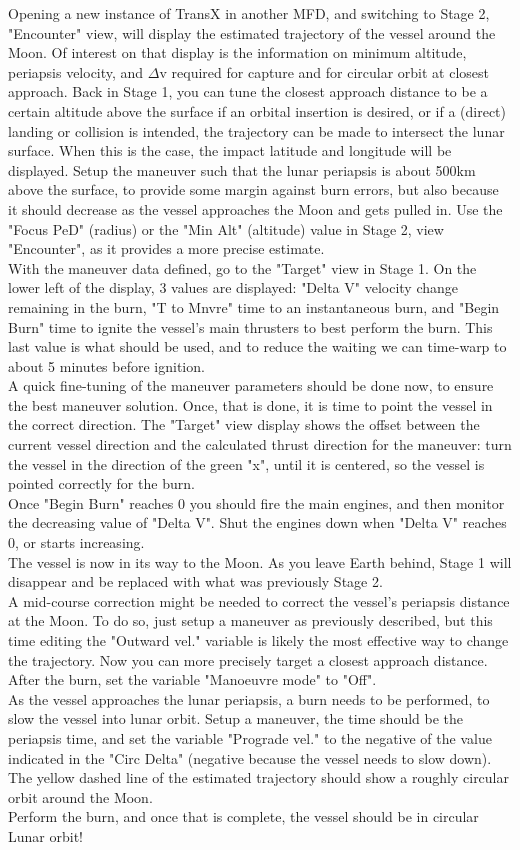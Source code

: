 \documentclass[Orbiter User Manual.tex]{subfiles}
\begin{document}
Opening a new instance of TransX in another MFD, and switching to Stage 2, "Encounter" view, will display the estimated trajectory of the vessel around the Moon. Of interest on that display is the information on minimum altitude, periapsis velocity, and $\Delta$v required for capture and for circular orbit at closest approach. Back in Stage 1, you can tune the closest approach distance to be a certain altitude above the surface if an orbital insertion is desired, or if a (direct) landing or collision is intended, the trajectory can be made to intersect the lunar surface. When this is the case, the impact latitude and longitude will be displayed. Setup the maneuver such that the lunar periapsis is about 500km above the surface, to provide some margin against burn errors, but also because it should decrease as the vessel approaches the Moon and gets pulled in. Use the "Focus PeD" (radius) or the "Min Alt" (altitude) value in Stage 2, view "Encounter", as it provides a more precise estimate.\\
With the maneuver data defined, go to the "Target" view in Stage 1. On the lower left of the display, 3 values are displayed: "Delta V" velocity change remaining in the burn, "T to Mnvre" time to an instantaneous burn, and "Begin Burn" time to ignite the vessel's main thrusters to best perform the burn. This last value is what should be used, and to reduce the waiting we can time-warp to about 5 minutes before ignition.\\
A quick fine-tuning of the maneuver parameters should be done now, to ensure the best maneuver solution. Once, that is done, it is time to point the vessel in the correct direction. The "Target" view display shows the offset between the current vessel direction and the calculated thrust direction for the maneuver: turn the vessel in the direction of the green "x", until it is centered, so the vessel is pointed correctly for the burn.\\
Once "Begin Burn" reaches 0 you should fire the main engines, and then monitor the decreasing value of "Delta V". Shut the engines down when "Delta V" reaches 0, or starts increasing.\\
The vessel is now in its way to the Moon. As you leave Earth behind, Stage 1 will disappear and be replaced with what was previously Stage 2.\\
A mid-course correction might be needed to correct the vessel's periapsis distance at the Moon. To do so, just setup a maneuver as previously described, but this time editing the "Outward vel." variable is likely the most effective way to change the trajectory. Now you can more precisely target a closest approach distance. After the burn, set the variable "Manoeuvre mode" to "Off".\\
As the vessel approaches the lunar periapsis, a burn needs to be performed, to slow the vessel into lunar orbit. Setup a maneuver, the time should be the periapsis time, and set the variable "Prograde vel." to the negative of the value indicated in the "Circ Delta" (negative because the vessel needs to slow down). The yellow dashed line of the estimated trajectory should show a roughly circular orbit around the Moon.\\
Perform the burn, and once that is complete, the vessel should be in circular Lunar orbit!
\end{document}
